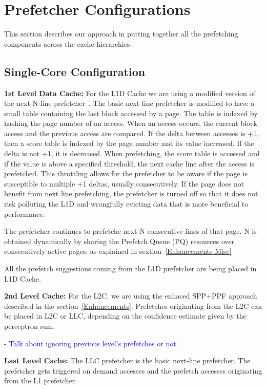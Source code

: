 \section{Prefetcher Configurations}
\label{Config}

This section describes our approach in putting together all the prefetching 
components across the cache hierarchies. 

\subsection{Single-Core Configuration}
\label{Config-Single}

\noindent \textbf{1st Level Data Cache:}
For the L1D Cache we are using a modified version of the next-N-line prefetcher~\cite{nextn}.
The basic next line prefetcher is modified to have a small table containing the last 
block accessed by a page. The table is indexed by hashing the page number of an access.
When an access occurs, the current block access and the previous access are compared.
If the delta between accesses is +1, then a score table is indexed by the page number and
its value increased. If the delta is not +1, it is decreased. When prefetching, the score table is 
accessed and if the value is above a specified threshold, the next cache line after the access is 
prefetched. This throttling allows for the prefetcher to be aware if the page is susceptible
to multiple +1 deltas, usually consecutively. If the page does not benefit from next line prefetching,
the prefetcher is turned off so that it does not risk polluting the L1D and wrongfully evicting
data that is more beneficial to performance.

The prefetcher continues to prefetche next N consecutive lines of that page. N is 
obtained dynamically by sharing the Prefetch Queue (PQ) resources over consecutively
active pages, as explained in sextion~\ref{Enhancements-Misc}

All the prefetch suggestions coming from the L1D prefetcher are being placed in L1D Cache.

\noindent \textbf{2nd Level Cache:}
For the L2C, we are using the enhaced SPP+PPF approach described in the 
section~\ref{Enhancements}. Prefetches originating from the L2C can be 
placed in L2C or LLC, depending on the confidence estimate given by the 
perceptron sum.

\textcolor{blue}{
- Talk about ignoring previous level's prefetches or not
}

\noindent \textbf{Last Level Cache:}
The LLC prefetcher is the basic next-line prefetcher. The prefetcher gets triggered
on demand accesses and the prefetch accesses originating from the L1 prefetcher. 

